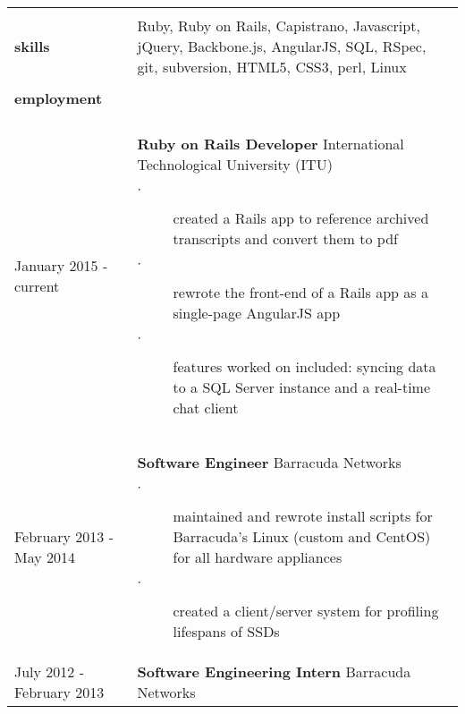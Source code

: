 \documentclass{article}
\begin{document}
\begin{tabular}{L{3cm} R{13.50cm}}

    \\ \hline \\

    \large{\textbf{skills}}
    \normalsize

    &

    Ruby, Ruby on Rails, Capistrano, Javascript, jQuery, Backbone.js, AngularJS, 
    SQL, RSpec, git, subversion, HTML5, CSS3, perl, Linux

    \\ \hline \\

    \large{\textbf{employment}} \\\\
    \normalsize

    January 2015 - current
    &
    \textbf{Ruby on Rails Developer}
    International Technological University (ITU)

    \begin{description}
        \item[$\cdot$] created a Rails app to reference archived
            transcripts and convert them to pdf 
        \item[$\cdot$] rewrote the front-end of a Rails app as a
            single-page AngularJS app
        \item[$\cdot$] features worked on included: syncing data
            to a SQL Server instance and a real-time chat client
    \end{description}

    \\

    February 2013 - May 2014
    &
    \textbf{Software Engineer}
    Barracuda Networks

    \begin{description}
        \item[$\cdot$] maintained and rewrote install scripts for Barracuda's Linux 
            (custom and CentOS) for all hardware appliances
        \item[$\cdot$] created a client/server system for profiling lifespans of
            SSDs
    \end{description}

    \\
    
    July 2012 - February 2013
    &
    \textbf{Software Engineering Intern}
    Barracuda Networks


\end{tabular}
\end{document}
